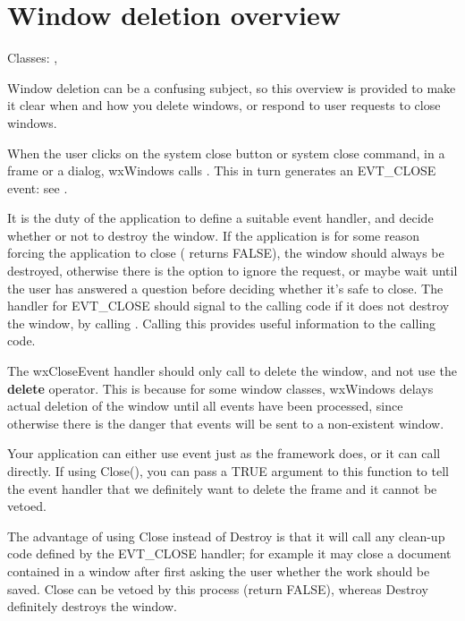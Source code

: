 \section{Window deletion overview}\label{windowdeletionoverview}

Classes: , 

Window deletion can be a confusing subject, so this overview is provided
to make it clear when and how you delete windows, or respond to user requests
to close windows.


When the user clicks on the system close button or system close command,
in a frame or a dialog, wxWindows calls . This
in turn generates an EVT\_CLOSE event: see .

It is the duty of the application to define a suitable event handler, and
decide whether or not to destroy the window.
If the application is for some reason forcing the application to close
( returns FALSE), the window should always be destroyed, otherwise there is the option to
ignore the request, or maybe wait until the user has answered a question
before deciding whether it's safe to close. The handler for EVT\_CLOSE should
signal to the calling code if it does not destroy the window, by calling 
. Calling this provides useful information
to the calling code.

The wxCloseEvent handler should only call  to
delete the window, and not use the {\bf delete} operator. This is because
for some window classes, wxWindows delays actual deletion of the window until all events have been processed,
since otherwise there is the danger that events will be sent to a non-existent window.


Your application can either use  event just as
the framework does, or it can call  directly.
If using Close(), you can pass a TRUE argument to this function to tell the event handler
that we definitely want to delete the frame and it cannot be vetoed.

The advantage of using Close instead of Destroy is that it will call any clean-up code
defined by the EVT\_CLOSE handler; for example it may close a document contained in
a window after first asking the user whether the work should be saved. Close can be vetoed
by this process (return FALSE), whereas Destroy definitely destroys the window.

